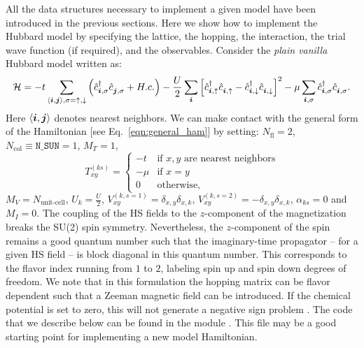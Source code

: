 

All the data structures necessary to implement a given model have been introduced in the previous sections. Here we show how to implement the Hubbard model  by specifying the lattice, the hopping, the interaction, the trial wave function  (if  required), and the observables.  Consider  the  \textit{plain vanilla}  Hubbard model  written as: 
\begin{equation}
\label{eqn_hubbard_Mz}
\mathcal{H}=
- t 
\sum\limits_{\langle \ve{i}, \ve{j} \rangle,  \sigma={\uparrow,\downarrow}} 
  \left(  \hat{c}^{\dagger}_{\ve{i}, \sigma} \hat{c}^{\phantom\dagger}_{\ve{j},\sigma}  + H.c. \right) 
- \frac{U}{2}\sum\limits_{\ve{i}}\left[
\hat{c}^{\dagger}_{\ve{i}, \uparrow} \hat{c}^{\phantom\dagger}_{\ve{i}, \uparrow}  -   \hat{c}^{\dagger}_{\ve{i}, \downarrow} \hat{c}^{\phantom\dagger}_{\ve{i}, \downarrow}  \right]^{2}   
-  \mu \sum_{\ve{i},\sigma } \hat{c}^{\dagger}_{\ve{i}, \sigma}  \hat{c}^{\phantom\dagger}_{\ve{i},\sigma}. 
\end{equation} 
Here $ \langle \boldsymbol{i}, \boldsymbol{j} \rangle $    denotes nearest neighbors. 
We can make contact with the general form of the Hamiltonian  [see Eq.~\eqref{eqn:general_ham}] by setting: 
$N_{\mathrm{fl}} = 2$, $N_{\mathrm{col}} \equiv \texttt{N\_SUN}     =1 $, 
 $M_T    =    1$, 
 \begin{equation}
  T^{(ks)}_{x y}   = 
  \left\{ 
 \begin{array}{ll}
       -t         & \text{if } x,y \text{ are nearest neighbors} \\
       -\mu    & \text{if } x = y \\
       0         &  \text{otherwise},
 \end{array}
  \right.
 \end{equation}
 $M_V   =  N_{\text{unit-cell}} $,  $U_{k}       =   \frac{U}{2}$, 
 $V_{x y}^{(k, s=1)} =  \delta_{x,y} \delta_{x,k}  $,  $V_{x y}^{(k, s=2)} =  - \delta_{x,y} \delta_{x,k}  $,  $\alpha_{ks}   = 0  $ and $M_I       = 0 $.   
The coupling of the HS fields to the $z$-component of the magnetization breaks the SU(2) spin symmetry. Nevertheless, the $z$-component of the spin remains a good quantum number such that the imaginary-time propagator -- for a given HS field -- is block  diagonal in this quantum number. This corresponds to the flavor index running from $1$ to $2$,  labeling spin up and spin down degrees of freedom. We note that  in this formulation the  hopping matrix can be flavor dependent such that a Zeeman  magnetic field can be introduced.  If the chemical potential is set to zero, this will not generate a negative sign problem \cite{Wu04,Milat04,Bercx09}.    
The code that we describe below  can be found in the module . This file may be a good starting point for implementing a new model Hamiltonian. 

